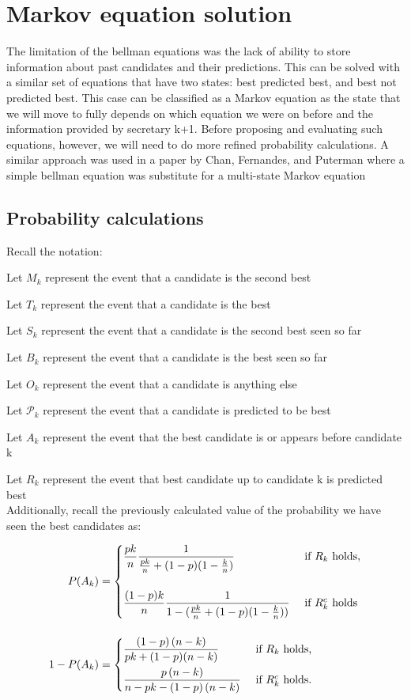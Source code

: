 \documentclass[a4paper,11pt]{article}
\begin{document}
\section{Markov equation solution}

The limitation of the bellman equations was the lack of ability to store information about past candidates and their predictions. This can be solved with a similar set of equations that have two states: best predicted best, and best not predicted best. This case can be classified as a Markov equation as the state that we will move to fully depends on which equation we were on before and the information provided by secretary k+1. Before proposing and evaluating such equations, however, we will need to do more refined probability calculations. A similar approach was used in a paper by Chan, Fernandes, and Puterman where a simple bellman equation was substitute for a multi-state Markov equation\cite{Chan_Fernandes_Puterman_2021}

\subsection{Probability calculations}

Recall the notation:

Let $M_k$ represent the event that a candidate is the second best

Let $T_k$ represent the event that a candidate is the best

Let $S_k$ represent the event that a candidate is the second best seen so far

Let $B_k$ represent the event that a candidate is the best seen so far

Let $O_k$ represent the event that a candidate is anything else

Let $\mathcal{P}_k$ represent the event that a candidate is predicted to be best

Let $A_k$ represent the event that the best candidate is or appears before candidate k

Let $R_k$ represent the event that best candidate up to candidate k is predicted best\\

Additionally, recall the previously calculated value of the probability we have seen the best candidates as:

\begin{align*}
P(A_k) &= 
\begin{dcases*}
   \frac{pk}{n}\frac{1}{\frac{pk}{n}+(1-p)(1-\frac{k}{n})} & \text{ if $R_k$ holds,}\\[12pt]
  \frac{(1-p)k}{n}\frac{1}{1-(\frac{pk}{n}+(1-p)(1-\frac{k}{n}))} & \text{ if $R_k^c$ holds}\\
\end{dcases*} \\[12pt]
1 - P(A_k) &= 
\begin{dcases*}
   \frac{\left(1-p\right)\left(n-k\right)}{pk+(1-p)(n-k)} & \text{ if $R_k$ holds,}\\
  \frac{p\left(n-k\right)}{n-pk-\left(1-p\right)\left(n-k\right)} & \text{ if $R_k^c$ holds.}\\
\end{dcases*}
\end{align*}
\end{document}

